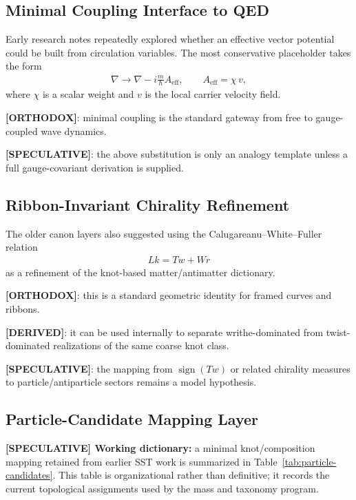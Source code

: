 \subsection{Minimal Coupling Interface to QED}
Early research notes repeatedly explored whether an effective vector potential could be built from circulation variables. The most conservative placeholder takes the form
\begin{align}
    \nabla \rightarrow \nabla - i\frac{m}{\hbar}A_{\mathrm{eff}},
    \qquad
    A_{\mathrm{eff}} = \chi \, v,
\end{align}
where $\chi$ is a scalar weight and $v$ is the local carrier velocity field.

\textbf{[ORTHODOX]}: minimal coupling is the standard gateway from free to gauge-coupled wave dynamics.

\textbf{[SPECULATIVE]}: the above substitution is only an analogy template unless a full gauge-covariant derivation is supplied.

\subsection{Ribbon-Invariant Chirality Refinement}
The older canon layers also suggested using the Calugareanu--White--Fuller relation
\begin{align}
    Lk = Tw + Wr
\end{align}
as a refinement of the knot-based matter/antimatter dictionary.

\textbf{[ORTHODOX]}: this is a standard geometric identity for framed curves and ribbons.

\textbf{[DERIVED]}: it can be used internally to separate writhe-dominated from twist-dominated realizations of the same coarse knot class.

\textbf{[SPECULATIVE]}: the mapping from $\operatorname{sign}(Tw)$ or related chirality measures to particle/antiparticle sectors remains a model hypothesis.

\subsection{Particle-Candidate Mapping Layer}
\textbf{[SPECULATIVE] Working dictionary:} a minimal knot/composition mapping retained from earlier SST work is summarized in Table~\ref{tab:particle-candidates}. This table is organizational rather than definitive; it records the current topological assignments used by the mass and taxonomy program.


